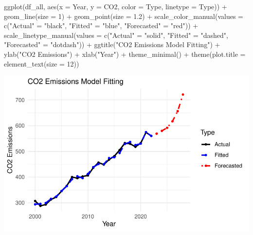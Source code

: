 \documentclass[
  letterpaper,
  DIV=11,
  numbers=noendperiod]{scrartcl}
\newenvironment{Shaded}{\begin{snugshade}}{\end{snugshade}}
\newcommand{\AttributeTok}[1]{\textcolor[rgb]{0.40,0.45,0.13}{#1}}
\newcommand{\DecValTok}[1]{\textcolor[rgb]{0.68,0.00,0.00}{#1}}
\newcommand{\FloatTok}[1]{\textcolor[rgb]{0.68,0.00,0.00}{#1}}
\newcommand{\FunctionTok}[1]{\textcolor[rgb]{0.28,0.35,0.67}{#1}}
\newcommand{\NormalTok}[1]{\textcolor[rgb]{0.00,0.23,0.31}{#1}}
\newcommand{\OtherTok}[1]{\textcolor[rgb]{0.00,0.23,0.31}{#1}}
\newcommand{\SpecialCharTok}[1]{\textcolor[rgb]{0.37,0.37,0.37}{#1}}
\newcommand{\StringTok}[1]{\textcolor[rgb]{0.13,0.47,0.30}{#1}}
\begin{document}
\begin{Shaded}
\begin{Highlighting}[]
\FunctionTok{ggplot}\NormalTok{(df\_all, }\FunctionTok{aes}\NormalTok{(}\AttributeTok{x =}\NormalTok{ Year, }\AttributeTok{y =}\NormalTok{ CO2, }\AttributeTok{color =}\NormalTok{ Type, }\AttributeTok{linetype =}\NormalTok{ Type)) }\SpecialCharTok{+}
  \FunctionTok{geom\_line}\NormalTok{(}\AttributeTok{size =} \DecValTok{1}\NormalTok{) }\SpecialCharTok{+}
  \FunctionTok{geom\_point}\NormalTok{(}\AttributeTok{size =} \FloatTok{1.2}\NormalTok{) }\SpecialCharTok{+}
  \FunctionTok{scale\_color\_manual}\NormalTok{(}\AttributeTok{values =} \FunctionTok{c}\NormalTok{(}\StringTok{"Actual"} \OtherTok{=} \StringTok{"black"}\NormalTok{, }\StringTok{"Fitted"} \OtherTok{=} \StringTok{"blue"}\NormalTok{, }\StringTok{"Forecasted"} \OtherTok{=} \StringTok{"red"}\NormalTok{)) }\SpecialCharTok{+}
  \FunctionTok{scale\_linetype\_manual}\NormalTok{(}\AttributeTok{values =} \FunctionTok{c}\NormalTok{(}\StringTok{"Actual"} \OtherTok{=} \StringTok{"solid"}\NormalTok{, }\StringTok{"Fitted"} \OtherTok{=} \StringTok{"dashed"}\NormalTok{, }\StringTok{"Forecasted"} \OtherTok{=} \StringTok{"dotdash"}\NormalTok{)) }\SpecialCharTok{+}
  \FunctionTok{ggtitle}\NormalTok{(}\StringTok{"CO2 Emissions Model Fitting"}\NormalTok{) }\SpecialCharTok{+}
  \FunctionTok{ylab}\NormalTok{(}\StringTok{"CO2 Emissions"}\NormalTok{) }\SpecialCharTok{+} \FunctionTok{xlab}\NormalTok{(}\StringTok{"Year"}\NormalTok{) }\SpecialCharTok{+}
  \FunctionTok{theme\_minimal}\NormalTok{() }\SpecialCharTok{+}
  \FunctionTok{theme}\NormalTok{(}\AttributeTok{plot.title =} \FunctionTok{element\_text}\NormalTok{(}\AttributeTok{size =} \DecValTok{12}\NormalTok{))}
\end{Highlighting}
\end{Shaded}

\includegraphics{project_files/figure-pdf/unnamed-chunk-29-1.pdf}
\end{document}

